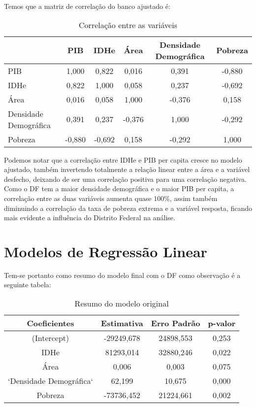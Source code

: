 \documentclass[
]{article}
\begin{document}
Temos que a matriz de correlação do banco ajustado é:

\begin{table}[H]

\caption{\label{tab:unnamed-chunk-7}Correlação entre as variáveis}
\centering
\begin{tabular}[t]{l|c|c|c|c|c}
\hline
  & PIB & IDHe & Área & Densidade Demográfica & Pobreza\\
\hline
PIB & 1,000 & 0,822 & 0,016 & 0,391 & -0,880\\
\hline
IDHe & 0,822 & 1,000 & 0,058 & 0,237 & -0,692\\
\hline
Área & 0,016 & 0,058 & 1,000 & -0,376 & 0,158\\
\hline
Densidade Demográfica & 0,391 & 0,237 & -0,376 & 1,000 & -0,292\\
\hline
Pobreza & -0,880 & -0,692 & 0,158 & -0,292 & 1,000\\
\hline
\end{tabular}
\end{table}

Podemos notar que a correlação entre IDHe e PIB per capita cresce no modelo ajustado, também invertendo totalmente a relação linear entre a área e a variável desfecho, deixando de ser uma correlação positiva para uma correlação negativa. Como o DF tem a maior densidade demográfica e o maior PIB per capita, a correlação entre as duas variáveis aumenta quase 100\%, assim também diminuindo a correlação da taxa de pobreza extrema e a variável resposta, ficando mais evidente a influência do Distrito Federal na análise.

\section{Modelos de Regressão Linear}

Tem-se portanto como resumo do modelo final com o DF como observação é a seguinte tabela:

\begin{table}[H]

\caption{\label{tab:unnamed-chunk-8}Resumo do modelo original}
\centering
\begin{tabular}[t]{c|c|c|c}
\hline
Coeficientes & Estimativa & Erro Padrão & p-valor\\
\hline
(Intercept) & -29249,678 & 24898,553 & 0,253\\
\hline
IDHe & 81293,014 & 32880,246 & 0,022\\
\hline
Área & 0,006 & 0,003 & 0,075\\
\hline
`Densidade Demográfica` & 62,199 & 10,675 & 0,000\\
\hline
Pobreza & -73736,452 & 21224,661 & 0,002\\
\hline
\end{tabular}
\end{table}
\end{document}
